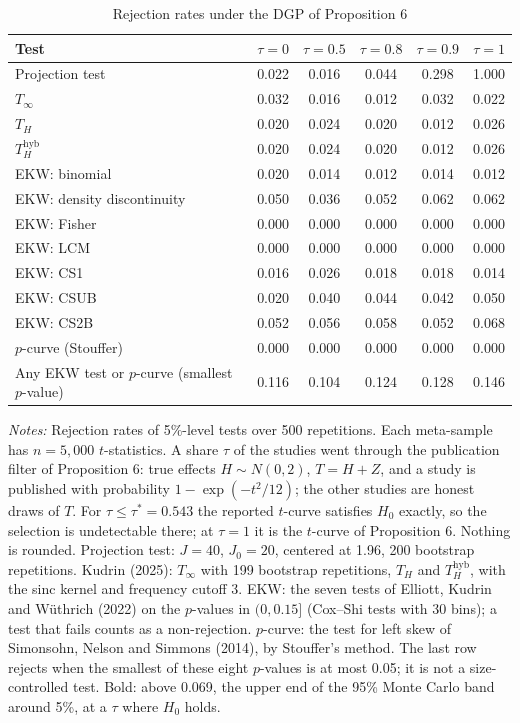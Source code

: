 \begin{table}[htbp]
\centering
\caption{Rejection rates under the DGP of Proposition 6}
\label{tab:prop6_power_n5000}
\footnotesize
\setlength{\tabcolsep}{4pt}
\begin{tabular}{lccccc}
\toprule
Test & $\tau = 0$ & $\tau = 0.5$ & $\tau = 0.8$ & $\tau = 0.9$ & $\tau = 1$ \\
\midrule
Projection test & 0.022 & 0.016 & 0.044 & 0.298 & 1.000 \\
\midrule
$T_\infty$ & 0.032 & 0.016 & 0.012 & 0.032 & 0.022 \\
$T_H$ & 0.020 & 0.024 & 0.020 & 0.012 & 0.026 \\
$T_H^{\mathrm{hyb}}$ & 0.020 & 0.024 & 0.020 & 0.012 & 0.026 \\
\midrule
EKW: binomial & 0.020 & 0.014 & 0.012 & 0.014 & 0.012 \\
EKW: density discontinuity & 0.050 & 0.036 & 0.052 & 0.062 & 0.062 \\
EKW: Fisher & 0.000 & 0.000 & 0.000 & 0.000 & 0.000 \\
EKW: LCM & 0.000 & 0.000 & 0.000 & 0.000 & 0.000 \\
EKW: CS1 & 0.016 & 0.026 & 0.018 & 0.018 & 0.014 \\
EKW: CSUB & 0.020 & 0.040 & 0.044 & 0.042 & 0.050 \\
EKW: CS2B & 0.052 & 0.056 & 0.058 & 0.052 & 0.068 \\
$p$-curve (Stouffer) & 0.000 & 0.000 & 0.000 & 0.000 & 0.000 \\
\midrule
Any EKW test or $p$-curve (smallest $p$-value) & 0.116 & 0.104 & 0.124 & 0.128 & 0.146 \\
\bottomrule
\end{tabular}
\par\smallskip
\begin{minipage}{\linewidth}\footnotesize\textit{Notes:} Rejection rates of 5\%-level tests over 500 repetitions. Each meta-sample has $n = 5{,}000$ $t$-statistics. A share $\tau$ of the studies went through the publication filter of Proposition 6: true effects $H \sim N(0, 2)$, $T = H + Z$, and a study is published with probability $1 - \exp(-t^2/12)$; the other studies are honest draws of $T$. For $\tau \le \tau^* = 0.543$ the reported $t$-curve satisfies $H_0$ exactly, so the selection is undetectable there; at $\tau = 1$ it is the $t$-curve of Proposition 6. Nothing is rounded. Projection test: $J = 40$, $J_0 = 20$, centered at 1.96, 200 bootstrap repetitions. Kudrin (2025): $T_\infty$ with 199 bootstrap repetitions, $T_H$ and $T_H^{\mathrm{hyb}}$, with the sinc kernel and frequency cutoff 3. EKW: the seven tests of Elliott, Kudrin and W\"uthrich (2022) on the $p$-values in $(0, 0.15]$ (Cox--Shi tests with 30 bins); a test that fails counts as a non-rejection. $p$-curve: the test for left skew of Simonsohn, Nelson and Simmons (2014), by Stouffer's method. The last row rejects when the smallest of these eight $p$-values is at most 0.05; it is not a size-controlled test. Bold: above 0.069, the upper end of the 95\% Monte Carlo band around 5\%, at a $\tau$ where $H_0$ holds.\end{minipage}
\end{table}
